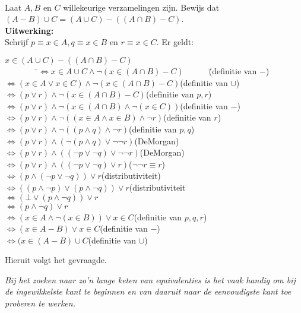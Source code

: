 \begin{answer}[Pittig!]\mbox{}\\
Laat $A, B$ en $C$ willekeurige verzamelingen zijn. Bewijs dat $(A-B)\cup C=(A\cup C)-((A\cap B) - C)$.\\[2.5pt]

\noindent\textbf{Uitwerking:}\\
Schrijf $p\equiv x\in A, q\equiv x\in B$ en $r\equiv x\in C$. Er geldt:
\begin{tabbing}
\indent $x\in(A\cup C)-((A\cap B)-C)$\\
\indent$\qquad\qquad$\=$\Leftrightarrow x\in A\cup C\land\neg(x\in (A\cap B) - C)\qquad\quad$\=(definitie van $-$)\\
\>$\Leftrightarrow(x\in A\lor x\in C)\land\neg(x\in(A\cap B)-C)$\>(definitie van $\cup$)\\
\>$\Leftrightarrow(p\lor r)\land\neg(x\in (A\cap B)-C)$\>(definitie van $p,r$)\\
\>$\Leftrightarrow(p\lor r)\land\neg(x\in(A\cap B)\land\neg(x\in C))$\>(definitie van $-$)\\
\>$\Leftrightarrow(p\lor r)\land\neg((x\in A\land x\in B)\land \neg r)$\>(definitie van $r$)\\
\>$\Leftrightarrow(p\lor r)\land\neg((p\land q)\land \neg r)$\>(definitie van $p,q$)\\
\>$\Leftrightarrow(p\lor r)\land(\neg(p\land q)\lor \neg\neg r)$\>(DeMorgan)\\
\>$\Leftrightarrow(p\lor r)\land((\neg p\lor\neg q)\lor \neg\neg r)$\>(DeMorgan)\\
\>$\Leftrightarrow(p\lor r)\land((\neg p\lor\neg q)\lor r)$\>($\neg\neg r\equiv r$)\\
\>$\Leftrightarrow(p\land (\neg p\lor\neg q))\lor r$\>(distributiviteit)\\
\>$\Leftrightarrow((p\land\neg p)\lor(p\land\neg q))\lor r$\>(distributiviteit\\
\>$\Leftrightarrow(\bot\lor(p\land\neg q))\lor r$\\
\>$\Leftrightarrow(p\land\neg q)\lor r$\\
\>$\Leftrightarrow(x\in A\land\neg (x\in B))\lor x\in C$\>(definitie van $p,q,r$)\\
\>$\Leftrightarrow(x\in A-B)\lor x\in C$\>(definitie van $-$)\\
\>$\Leftrightarrow(x\in(A-B)\cup C$\>(definitie van $\cup$)
\end{tabbing}
Hieruit volgt het gevraagde.

\textit{Bij het zoeken naar zo'n lange keten van equivalenties is het vaak handig om bij de ingewikkelste kant te beginnen en van daaruit naar de eenvoudigste kant toe proberen te werken.}
\end{answer}

